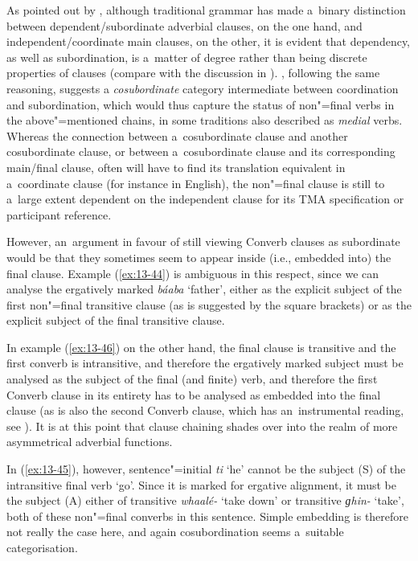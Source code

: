 As pointed out by \citet[327-8]{givon2001b}, although traditional grammar has made a~binary distinction between dependent/subordinate adverbial clauses, on the one hand, and independent/coordinate main clauses, on the other, it is evident that dependency, as well as subordination, is a~matter of degree rather than being discrete properties of clauses (compare with the discussion in \citet[]{cristofaro2005}). \citet[20--27]{haspelmath1995}, following the same reasoning, suggests a \textit{cosubordinate} category intermediate between coordination and subordination, which would thus capture the status of non"=final verbs in the above"=mentioned chains, in some traditions also described as \textit{medial} verbs. Whereas the connection between a~cosubordinate clause and another cosubordinate clause, or between a~cosubordinate clause and its corresponding main/final clause, often will have to find its translation equivalent in a~coordinate clause (for instance in English), the non"=final clause is still to a~large extent dependent on the independent clause for its TMA specification or participant reference.



However, an~argument in favour of still viewing Converb clauses as subordinate would be that they sometimes seem to appear inside (i.e., embedded into) the final clause. Example (\ref{ex:13-44}) is ambiguous in this respect, since we can analyse the ergatively marked \textit{báaba} `father', either as the explicit subject of the first non"=final transitive clause (as is suggested by the square brackets) or as the explicit subject of the final transitive clause. 



In example (\ref{ex:13-46}) on the other hand, the final clause is transitive and the first converb is intransitive, and therefore the ergatively marked subject must be analysed as the subject of the final (and finite) verb, and therefore the first Converb clause in its entirety has to be analysed as embedded into the final clause (as is also the second Converb clause, which has an~instrumental reading, see ). It is at this point that clause chaining shades over into the realm of more asymmetrical adverbial functions. 



In (\ref{ex:13-45}), however, sentence"=initial \textit{ti} `he' cannot be the subject (S) of the intransitive final verb `go'. Since it is marked for ergative alignment, it must be the subject (A) either of transitive \textit{whaalé-} `take down' or transitive \textit{ɡhin-} `take', both of these non"=final converbs in this sentence. Simple embedding is therefore not really the case here, and again cosubordination seems a~suitable categorisation. 



